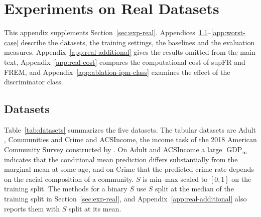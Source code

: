 \documentclass{article} %
\begin{document}
\section{Experiments on Real Datasets}
\label{app:real-experiments}

This appendix supplements Section~\ref{sec:exp-real}.  Appendices~\ref{app:real-datasets}--\ref{app:worst-case} describe the datasets, the training settings, the baselines and the evaluation measures.  Appendix~\ref{app:real-additional} gives the results omitted from the main text, Appendix~\ref{app:real-cost} compares the computational cost of supFR and FREM, and Appendix~\ref{app:ablation-ipm-class} examines the effect of the discriminator class.

\subsection{Datasets}
\label{app:real-datasets}

Table~\ref{tab:datasets} summarizes the five datasets.  The tabular datasets are Adult \citep{adult_2}, Communities and Crime \citep{communities_and_crime_183} and ACSIncome, the income task of the 2018 American Community Survey constructed by \citet{ding2021retiring}.  On Adult and ACSIncome a large $\operatorname{GDP}_{\infty}$ indicates that the conditional mean prediction differs substantially from the marginal mean at some age, and on Crime that the predicted crime rate depends on the racial composition of a community.  $S$ is min--max scaled to $[0,1]$ on the training split.  The methods for a binary $S$ use $S$ split at the median of the training split in Section~\ref{sec:exp-real}, and Appendix~\ref{app:real-additional} also reports them with $S$ split at its mean.

\begin{table}[!htb]
\centering
\caption{Datasets.}
\label{tab:datasets}
\footnotesize
\setlength{\tabcolsep}{4pt}
\end{table}
\end{document}
